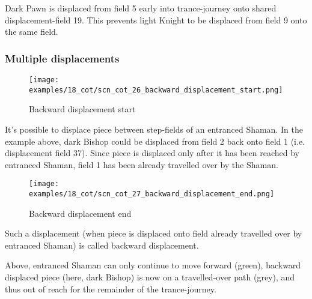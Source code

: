 Dark Pawn is displaced from field 5 early into trance-journey onto shared displacement-field
19. This prevents light Knight to be displaced from field 9 onto the same field.

\clearpage %

\subsubsection*{Multiple displacements}

\noindent
\begin{figure}[!h]
\vspace{-1.0\baselineskip}
\texttt{[image: examples/18\_cot/scn\_cot\_26\_backward\_displacement\_start.png]}
\caption{Backward displacement start}
\label{fig:scn_cot_26_backward_displacement_start}
\end{figure}

It's possible to displace piece between step-fields of an entranced Shaman. In the example
above, dark Bishop could be displaced from field 2 back onto field 1 (i.e. displacement
field 37). Since piece is displaced only after it has been reached by entranced Shaman,
field 1 has been already travelled over by the Shaman.

\clearpage %

\noindent
\begin{figure}[!h]
\texttt{[image: examples/18\_cot/scn\_cot\_27\_backward\_displacement\_end.png]}
\caption{Backward displacement end}
\label{fig:scn_cot_27_backward_displacement_end}
\end{figure}

Such a displacement (when piece is displaced onto field already travelled over
by entranced Shaman) is called backward displacement.

Above, entranced Shaman can only continue to move forward (green), backward displaced
piece (here, dark Bishop) is now on a travelled-over path (grey), and thus out of reach
for the remainder of the trance-journey.

\clearpage %

